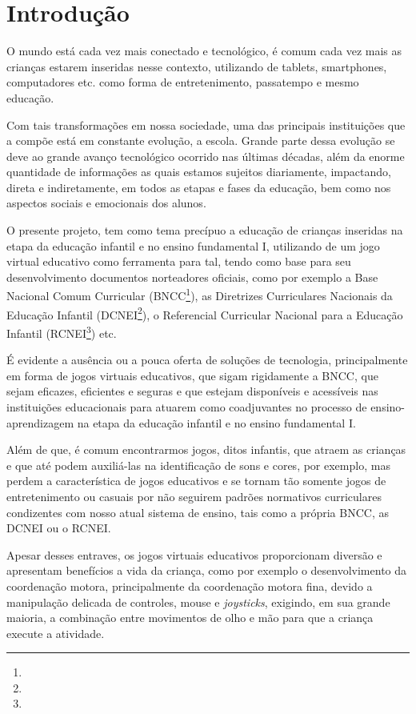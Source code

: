 \documentclass[article,12pt,openany,oneside,a4paper,english,brazil]{abntex2}
\begin{document}
\section{Introdução} \label{sc:intro}

O mundo está cada vez mais conectado e tecnológico, é comum cada vez mais as crianças estarem inseridas nesse contexto, utilizando de tablets, smartphones, computadores etc. como forma de entretenimento, passatempo e mesmo educação.

Com tais transformações em nossa sociedade, uma das principais instituições que a compõe 
está em constante evolução, a escola. Grande parte dessa evolução se deve ao grande avanço tecnológico ocorrido nas últimas décadas, além da enorme quantidade de informações as quais estamos sujeitos diariamente, impactando, direta e indiretamente, em todos as etapas e fases da educação, bem como nos aspectos sociais e emocionais dos alunos.

O presente projeto, tem como tema precípuo a educação de crianças inseridas na etapa da educação infantil e no ensino fundamental I, utilizando de um jogo virtual educativo como ferramenta para tal, tendo como base para seu desenvolvimento documentos norteadores oficiais, como por exemplo a Base Nacional Comum Curricular (BNCC\footnote{}), as Diretrizes Curriculares Nacionais da Educação Infantil (DCNEI\footnote{}), o Referencial Curricular Nacional para a Educação Infantil (RCNEI\footnote{}) etc.

É evidente a ausência ou a pouca oferta de soluções de tecnologia, principalmente em forma de jogos virtuais educativos, que sigam rigidamente a BNCC, que sejam eficazes, eficientes e seguras e que estejam disponíveis e acessíveis nas instituições educacionais para atuarem como coadjuvantes no processo de ensino-aprendizagem na etapa da educação infantil e no ensino fundamental I.

Além de que, é comum encontrarmos jogos, ditos infantis, que atraem as crianças e que até podem auxiliá-las na identificação de sons e cores, por exemplo, mas perdem a característica de jogos educativos e se tornam tão somente jogos de entretenimento ou casuais por não seguirem padrões normativos curriculares condizentes com nosso atual sistema de ensino, tais como a própria BNCC, as DCNEI ou o RCNEI.

Apesar desses entraves, os jogos virtuais educativos proporcionam diversão e apresentam benefícios a vida da criança, como por exemplo o desenvolvimento da coordenação motora, principalmente da coordenação motora fina, devido a manipulação delicada de controles, mouse e \textit{joysticks}, exigindo, em sua grande maioria, a combinação entre movimentos de olho e mão para que a criança execute a atividade.
\end{document}

